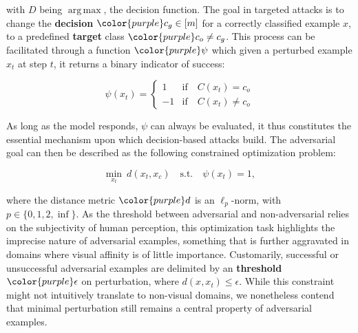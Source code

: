 \noindent with $D$ being $\operatorname*{arg\,max}$, the decision function.
The goal in targeted attacks is to change the \textbf{decision} $\color{purple}c_g \in [m]$ for a correctly classified example $x$, to a predefined \textbf{target} class $\color{purple}c_o \neq c_g$.
This process can be facilitated through a function $\color{purple}\psi$ which given a perturbed example $x_t$ at step $t$, it returns a binary indicator of success:

\begin{equation}
    \psi(x_t) = \begin{cases}
                    1 & \text{if}\quad C(x_t) = c_o\\
                    -1 & \text{if}\quad C(x_t) \neq c_o
                \end{cases}
\label{eqn:psi}
\end{equation}

As long as the model responds, $\psi$ can always be evaluated, it thus constitutes the essential mechanism upon which decision-based attacks build.
The adversarial goal can then be described as the following constrained optimization problem:

\begin{equation}
    \operatorname*{min}_{x_t} \: d(x_t,x_c) \quad \text{s.t.} \quad \psi(x_t) = 1,
\label{eqn:opt}
\end{equation}

\noindent where the distance metric $\color{purple}d$ is an $\ell_p$-norm, with $p \in \{0,1,2,\inf\}$.
As the threshold between adversarial and non-adversarial relies on the subjectivity of human perception, this optimization task highlights the imprecise nature of adversarial examples, something that is further aggravated in domains where visual affinity is of little importance.
Customarily, successful or unsuccessful adversarial examples are delimited by an \textbf{threshold} $\color{purple}\epsilon$ on perturbation, where $d(x,x_t) \leq \epsilon$.
While this constraint might not intuitively translate to non-visual domains, we nonetheless contend that minimal perturbation still remains a central property of adversarial examples.

